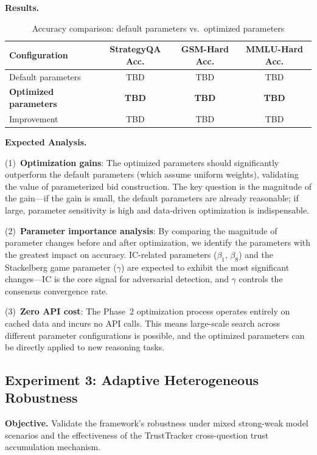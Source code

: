 \documentclass[12pt,a4paper]{article}
\begin{document}
\textbf{Results.}

\begin{table}[H]
\centering
\caption{Accuracy comparison: default parameters vs.\ optimized parameters}\label{tab:exp2_result}
\begin{tabular}{lccc}
\toprule
Configuration & StrategyQA Acc. & GSM-Hard Acc. & MMLU-Hard Acc. \\
\midrule
Default parameters & TBD & TBD & TBD \\
\textbf{Optimized parameters} & \textbf{TBD} & \textbf{TBD} & \textbf{TBD} \\
Improvement & TBD & TBD & TBD \\
\bottomrule
\end{tabular}
\end{table}

\textbf{Expected Analysis.}

(1)~\textbf{Optimization gains}: The optimized parameters should significantly outperform the default parameters (which assume uniform weights), validating the value of parameterized bid construction. The key question is the magnitude of the gain---if the gain is small, the default parameters are already reasonable; if large, parameter sensitivity is high and data-driven optimization is indispensable.

(2)~\textbf{Parameter importance analysis}: By comparing the magnitude of parameter changes before and after optimization, we identify the parameters with the greatest impact on accuracy. IC-related parameters ($\beta_1$, $\beta_8$) and the Stackelberg game parameter ($\gamma$) are expected to exhibit the most significant changes---IC is the core signal for adversarial detection, and $\gamma$ controls the consensus convergence rate.

(3)~\textbf{Zero API cost}: The Phase~2 optimization process operates entirely on cached data and incurs no API calls. This means large-scale search across different parameter configurations is possible, and the optimized parameters can be directly applied to new reasoning tasks.

\subsection{Experiment 3: Adaptive Heterogeneous Robustness}\label{sec:exp3}

\textbf{Objective.} Validate the framework's robustness under mixed strong-weak model scenarios and the effectiveness of the TrustTracker cross-question trust accumulation mechanism.
\end{document}
